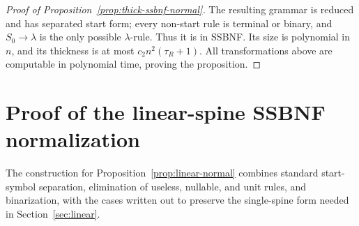 \documentclass[11pt,a4paper]{article}
\theoremstyle{remark}
\theoremstyle{plain}
\begin{document}
\begin{proof}[Proof of Proposition~\ref{prop:thick-ssbnf-normal}]
The resulting grammar is reduced and has separated start form; every non-start
rule is terminal or binary, and $S_0\to\lambda$ is the only possible
$\lambda$-rule.  Thus it is in SSBNF.  Its size is polynomial in $n$, and
its thickness is at most $c_2 n^2(\tau_R+1)$.  All transformations above are
computable in polynomial time, proving the proposition.
\end{proof}

\section{Proof of the linear-spine SSBNF normalization}
\label{app:linear-normalization}

The construction for Proposition~\ref{prop:linear-normal} combines standard
start-symbol separation, elimination of useless, nullable, and unit rules,
and binarization, with the cases written out to preserve the single-spine form
needed in Section~\ref{sec:linear}.
\end{document}
